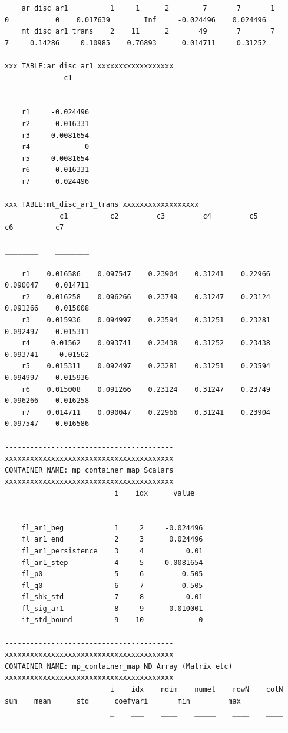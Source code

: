 \documentclass[
]{book}
\begin{document}
\begin{verbatim}
    ar_disc_ar1          1     1      2        7       7       1       0           0    0.017639        Inf     -0.024496    0.024496
    mt_disc_ar1_trans    2    11      2       49       7       7       7     0.14286     0.10985    0.76893      0.014711     0.31252

xxx TABLE:ar_disc_ar1 xxxxxxxxxxxxxxxxxx
              c1    
          __________

    r1     -0.024496
    r2     -0.016331
    r3    -0.0081654
    r4             0
    r5     0.0081654
    r6      0.016331
    r7      0.024496

xxx TABLE:mt_disc_ar1_trans xxxxxxxxxxxxxxxxxx
             c1          c2         c3         c4         c5          c6          c7   
          ________    ________    _______    _______    _______    ________    ________

    r1    0.016586    0.097547    0.23904    0.31241    0.22966    0.090047    0.014711
    r2    0.016258    0.096266    0.23749    0.31247    0.23124    0.091266    0.015008
    r3    0.015936    0.094997    0.23594    0.31251    0.23281    0.092497    0.015311
    r4     0.01562    0.093741    0.23438    0.31252    0.23438    0.093741     0.01562
    r5    0.015311    0.092497    0.23281    0.31251    0.23594    0.094997    0.015936
    r6    0.015008    0.091266    0.23124    0.31247    0.23749    0.096266    0.016258
    r7    0.014711    0.090047    0.22966    0.31241    0.23904    0.097547    0.016586

----------------------------------------
xxxxxxxxxxxxxxxxxxxxxxxxxxxxxxxxxxxxxxxx
CONTAINER NAME: mp_container_map Scalars
xxxxxxxxxxxxxxxxxxxxxxxxxxxxxxxxxxxxxxxx
                          i    idx      value  
                          _    ___    _________

    fl_ar1_beg            1     2     -0.024496
    fl_ar1_end            2     3      0.024496
    fl_ar1_persistence    3     4          0.01
    fl_ar1_step           4     5     0.0081654
    fl_p0                 5     6         0.505
    fl_q0                 6     7         0.505
    fl_shk_std            7     8          0.01
    fl_sig_ar1            8     9      0.010001
    it_std_bound          9    10             0

----------------------------------------
xxxxxxxxxxxxxxxxxxxxxxxxxxxxxxxxxxxxxxxx
CONTAINER NAME: mp_container_map ND Array (Matrix etc)
xxxxxxxxxxxxxxxxxxxxxxxxxxxxxxxxxxxxxxxx
                         i    idx    ndim    numel    rowN    colN    sum    mean      std      coefvari       min         max  
                         _    ___    ____    _____    ____    ____    ___    ____    _______    ________    __________    ______


\end{verbatim}
\end{document}
